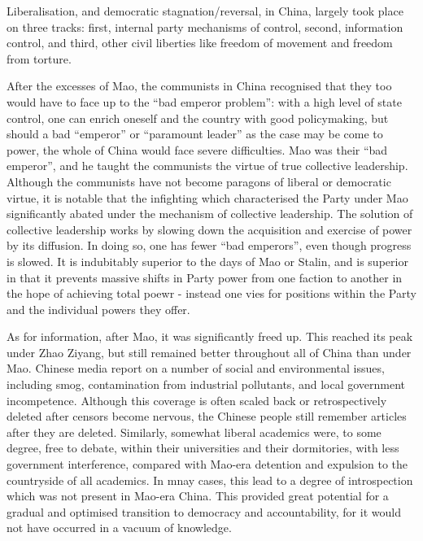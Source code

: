 \documentclass[11pt,a4paper]{report}
\newcounter{count}
\begin{document}
\begin{multicols}{2}
	
Liberalisation, and democratic stagnation/reversal, in China, largely took place on three tracks: first, internal party mechanisms of control, second, information control, and third, other civil liberties like freedom of movement and freedom from torture.

After the excesses of Mao, the communists in China recognised that they too would have to face up to the ``bad emperor problem'': with a high level of state control, one can enrich oneself and the country with good policymaking, but should a bad ``emperor'' or ``paramount leader'' as the case may be come to power, the whole of China would face severe difficulties. Mao was their ``bad emperor'', and he taught the communists the virtue of true collective leadership. Although the communists have not become paragons of liberal or democratic virtue, it is notable that the infighting which characterised the Party under Mao significantly abated under the mechanism of collective leadership. The solution of collective leadership works by slowing down the acquisition and exercise of power by its diffusion. In doing so, one has fewer ``bad emperors'', even though progress is slowed. It is indubitably superior to the days of Mao or Stalin, and is superior in that it prevents massive shifts in Party power from one faction to another in the hope of achieving total poewr - instead one vies for positions within the Party and the individual powers they offer.

As for information, after Mao, it was significantly freed up. This reached its peak under Zhao Ziyang, but still remained better throughout all of China than under Mao. Chinese media report on a number of social and environmental issues, including smog, contamination from industrial pollutants, and local government incompetence. Although this coverage is often scaled back or retrospectively deleted after censors become nervous, the Chinese people still remember articles after they are deleted. Similarly, somewhat liberal academics were, to some degree, free to debate, within their universities and their dormitories, with less government interference, compared with Mao-era detention and expulsion to the countryside of all academics. In mnay cases, this lead to a degree of introspection which was not present in Mao-era China. This provided great potential for a gradual and optimised transition to democracy and accountability, for it would not have occurred in a vacuum of knowledge.


\end{multicols}
\end{document}
